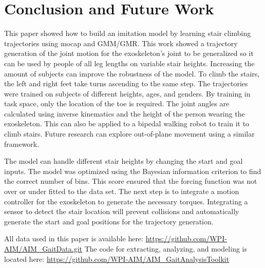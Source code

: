 \section{Conclusion and Future Work} 
\label{sec:conclusion}
This paper showed how to build an imitation model by learning stair climbing trajectories using mocap and GMM/GMR. This work showed a trajectory generation of the joint motion for the exoskeleton's joint to be generalized so it can be used by people of all leg lengths on variable stair heights. Increasing the amount of subjects can improve the robustness of the model. To climb the stairs, the left and right feet take turns ascending to the same step. The trajectories were trained on subjects of different heights, ages, and genders. By training in task space, only the location of the toe is required. The joint angles are calculated using inverse kinematics and the height of the person wearing the exoskeleton. This can also be applied to a bipedal walking robot to train it to climb stairs. Future research can explore out-of-plane movement using a similar framework. 

The model can handle different stair heights by changing the start and goal inputs.  The model was optimized using the Bayesian information criterion to find the correct number of bins. This score ensured that the forcing function was not over or under fitted to the data set. The next step is to integrate a motion controller for the exoskeleton to generate the necessary torques. Integrating a sensor to detect the stair location will prevent collisions and automatically generate the start and goal positions for the trajectory generation.  

All data used in this paper is available here: \url{https://github.com/WPI-AIM/AIM_GaitData.git}
The code for extracting, analyzing, and modeling is located here: \url{https://github.com/WPI-AIM/AIM\_GaitAnalysisToolkit}




